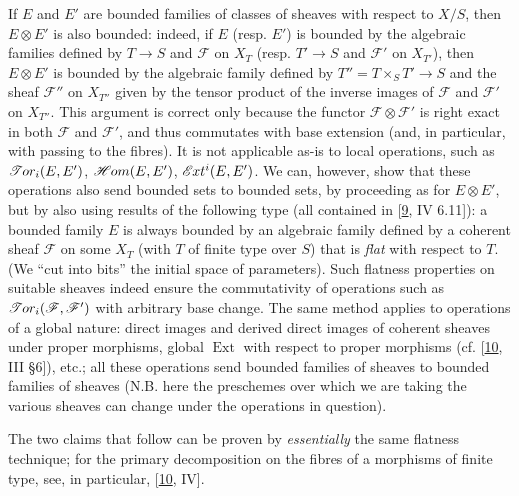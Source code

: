 \documentclass{article}
\newcommand{\oldpage}[1]{\marginpar{\footnotesize$\Big\vert$ \textit{p.~#1}}}
\theoremstyle{definition}
\theoremstyle{definition}
\theoremstyle{definition}
\theoremstyle{definition}
\theoremstyle{remark}
\begin{document}
If \(E\) and \(E'\) are bounded families of classes of sheaves with respect to \(X/S\), then \(E\otimes E'\) is also bounded:
indeed, if \(E\) (resp. \(E'\)) is bounded by the algebraic families defined by \(T\to S\) and \({\mathscr{F}}\) on \(X_T\) (resp. \(T'\to S\) and \({\mathscr{F}}'\) on \(X_{T'}\)), then \(E\otimes E'\) is bounded by the algebraic family defined by \(T''=T\times_S T'\to S\) and the sheaf \({\mathscr{F}}''\) on \(X_{T''}\) given by the tensor product of the inverse images of \({\mathscr{F}}\) and \({\mathscr{F}}'\) on \(X_{T''}\).
This argument is correct only because the functor \({\mathscr{F}}\otimes{\mathscr{F}}'\) is right exact in both \({\mathscr{F}}\) and \({\mathscr{F}}'\), and thus commutates with base extension (and, in particular, with passing to the fibres).
It is not applicable as-is to local operations, such as \(\mathscr{T}\kern -.5pt or_i(E,E')\), \(\mathscr{H}\kern -.5pt om(E,E')\), \(\mathscr{E}\kern -.5pt xt^i(E,E')\).
We can, however, show that these operations also send bounded sets to bounded sets, by proceeding as for \(E\otimes E'\), but by also using results of the following type (all contained in {[}\protect\hyperlink{ref-Gro1960b}{9}, IV 6.11{]}):
a bounded family \(E\) is always bounded by an algebraic family defined by a coherent sheaf \({\mathscr{F}}\) on some \(X_T\) (with \(T\) of finite type over \(S\)) that is \emph{flat} with respect to \(T\).
(We ``cut into bits'' the initial space of parameters).
\oldpage{221-04}Such flatness properties on suitable sheaves indeed ensure the commutativity of operations such as \(\mathscr{T}\kern -.5pt or_i({\mathscr{F}},{\mathscr{F}}')\) with arbitrary base change.
The same method applies to operations of a global nature:
direct images and derived direct images of coherent sheaves under proper morphisms, global \(\operatorname{Ext}\) with respect to proper morphisms (cf. {[}\protect\hyperlink{ref-GD1960}{10}, III §6{]}), etc.;
all these operations send bounded families of sheaves to bounded families of sheaves (N.B. here the preschemes over which we are taking the various sheaves can change under the operations in question).

The two claims that follow can be proven by \emph{essentially} the same flatness technique;
for the primary decomposition on the fibres of a morphisms of finite type, see, in particular, {[}\protect\hyperlink{ref-GD1960}{10}, IV{]}.
\end{document}
